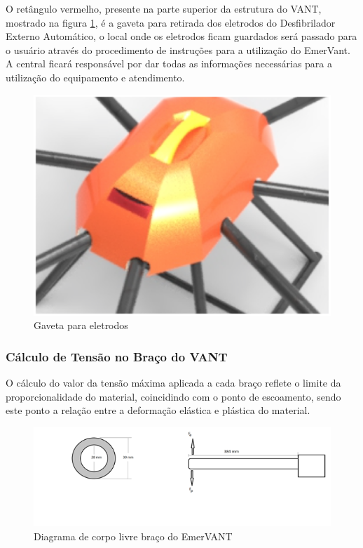 O retângulo vermelho, presente na parte superior da estrutura do VANT, mostrado na figura \ref{fig:keyshot2}, é a gaveta para retirada dos eletrodos do Desfibrilador Externo Automático, o local onde os eletrodos ficam guardados será passado para o usuário através do procedimento de instruções para a utilização do EmerVant. A central ficará responsável por dar todas as informações necessárias para a utilização do equipamento e atendimento.

\begin{figure}[H]
    \centering
      \includegraphics[keepaspectratio=true,scale=0.5]{figuras/keyshot2.eps}
    \caption{ Gaveta para eletrodos}
    \label{fig:keyshot2}
\end{figure}

\subsubsection{Cálculo de Tensão no Braço do VANT}

O cálculo do valor da tensão máxima aplicada a cada braço reflete o limite da proporcionalidade
do material, coincidindo com o ponto de escoamento, sendo este ponto a relação entre a 
deformação elástica e plástica do material. 

\begin{figure}[H]
    \centering
      \includegraphics[keepaspectratio=true,scale=0.5]{figuras/corpo_livre.png}
    \caption{Diagrama de corpo livre braço do EmerVANT}
    \label{fig:diagrama_corpo}
\end{figure}

